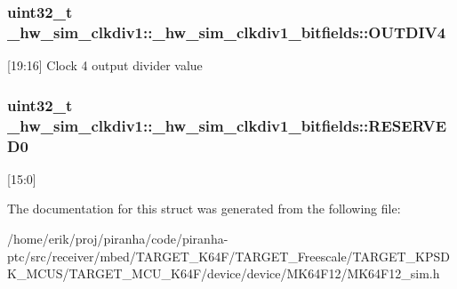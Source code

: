 \subsubsection[{\texorpdfstring{O\+U\+T\+D\+I\+V4}{OUTDIV4}}]{\setlength{\rightskip}{0pt plus 5cm}uint32\+\_\+t \+\_\+hw\+\_\+sim\+\_\+clkdiv1\+::\+\_\+hw\+\_\+sim\+\_\+clkdiv1\+\_\+bitfields\+::\+O\+U\+T\+D\+I\+V4}\hypertarget{struct__hw__sim__clkdiv1_1_1__hw__sim__clkdiv1__bitfields_ae4afa2602d724e5f40ca69b84c986711}{}\label{struct__hw__sim__clkdiv1_1_1__hw__sim__clkdiv1__bitfields_ae4afa2602d724e5f40ca69b84c986711}
\mbox{[}19\+:16\mbox{]} Clock 4 output divider value 
\subsubsection[{\texorpdfstring{R\+E\+S\+E\+R\+V\+E\+D0}{RESERVED0}}]{\setlength{\rightskip}{0pt plus 5cm}uint32\+\_\+t \+\_\+hw\+\_\+sim\+\_\+clkdiv1\+::\+\_\+hw\+\_\+sim\+\_\+clkdiv1\+\_\+bitfields\+::\+R\+E\+S\+E\+R\+V\+E\+D0}\hypertarget{struct__hw__sim__clkdiv1_1_1__hw__sim__clkdiv1__bitfields_a4fc857dca7ff64486b22d7275fc16f9c}{}\label{struct__hw__sim__clkdiv1_1_1__hw__sim__clkdiv1__bitfields_a4fc857dca7ff64486b22d7275fc16f9c}
\mbox{[}15\+:0\mbox{]} 

The documentation for this struct was generated from the following file\+:\begin{DoxyCompactItemize}
\item 
/home/erik/proj/piranha/code/piranha-\/ptc/src/receiver/mbed/\+T\+A\+R\+G\+E\+T\+\_\+\+K64\+F/\+T\+A\+R\+G\+E\+T\+\_\+\+Freescale/\+T\+A\+R\+G\+E\+T\+\_\+\+K\+P\+S\+D\+K\+\_\+\+M\+C\+U\+S/\+T\+A\+R\+G\+E\+T\+\_\+\+M\+C\+U\+\_\+\+K64\+F/device/device/\+M\+K64\+F12/M\+K64\+F12\+\_\+sim.\+h\end{DoxyCompactItemize}
